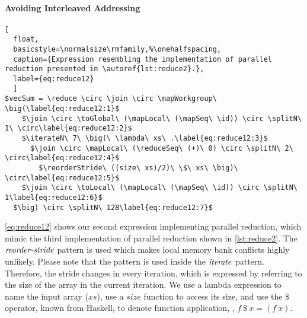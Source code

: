 \paragraph{Avoiding Interleaved Addressing}
\begin{lstlisting}[
  float,
  basicstyle=\normalsize\rmfamily,%\onehalfspacing,
  caption={Expression resembling the implementation of parallel reduction presented in \autoref{lst:reduce2}.},
  label={eq:reduce12}
  ]
$vecSum = \reduce \circ \join \circ \mapWorkgroup\ \big(\label{eq:reduce12:1}$
    $\join \circ \toGlobal\ (\mapLocal\ (\mapSeq\ \id)) \circ \splitN\ 1\ \circ\label{eq:reduce12:2}$
    $\iterateN\ 7\ \big(\ \lambda\ xs\ .\label{eq:reduce12:3}$
      $\join \circ \mapLocal\ (\reduceSeq\ (+)\ 0) \circ \splitN\ 2\ \circ\label{eq:reduce12:4}$
        $\reorderStride\ ((size\ xs)/2)\ \$\ xs\ \big)\ \circ\label{eq:reduce12:5}$
    $\join \circ \toLocal\ (\mapLocal\ (\mapSeq\ \id)) \circ \splitN\ 1\label{eq:reduce12:6}$
  $\big) \circ \splitN\ 128\label{eq:reduce12:7}$
\end{lstlisting}
%
\autoref{eq:reduce12} shows our second expression implementing parallel reduction, which mimic the third implementation of parallel reduction shown in \autoref{lst:reduce2}.
The $\text{\textit{reorder-stride}}$ pattern is used which makes local memory bank conflicts highly unlikely.
Please note that the pattern is used inside the $\text{\textit{iterate}}$ pattern.
Therefore, the stride changes in every iteration, which is expressed by referring to the size of the array in the current iteration.
We use a lambda expression to name the input array ($xs$), use a $size$ function to access its size, and use the $\$$ operator, known from Haskell, to denote function application, \ie, $f\ \$\ x = (f\ x)$.



